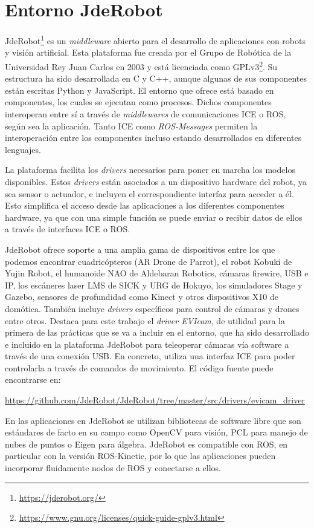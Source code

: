 \section{Entorno JdeRobot}
JdeRobot\footnote{\url{https://jderobot.org/}} es un \textit{middleware} abierto para el desarrollo de aplicaciones con robots y visión artificial. Esta plataforma fue creada por el Grupo de Robótica de la Universidad Rey Juan Carlos en 2003 y está licenciada como GPLv3\footnote{\url{https://www.gnu.org/licenses/quick-guide-gplv3.html}}.
Su estructura ha sido desarrollada en C y C++, aunque algunas de sus componentes están escritas Python y JavaScript. El entorno que ofrece está basado en componentes, los cuales se ejecutan como procesos. Dichos componentes interoperan entre sí a través de \textit{middlewares} de comunicaciones ICE o  ROS, según sea la aplicación. Tanto ICE como \textit{ROS-Messages} permiten la interoperación entre los componentes incluso estando desarrollados en diferentes lenguajes.

La plataforma facilita los \textit{drivers} necesarios para poner en marcha los modelos disponibles. Estos \textit{drivers} están asociados a un dispositivo hardware del robot, ya sea sensor o actuador, e incluyen el correspondiente interfaz para acceder a él. Esto simplifica el acceso desde las aplicaciones a los diferentes componentes hardware, ya que con una simple función se puede enviar o recibir datos de ellos a través de interfaces ICE o ROS.

JdeRobot ofrece soporte a una amplia gama de dispositivos entre los que podemos encontrar cuadricópteros (AR Drone de Parrot), el robot Kobuki de Yujin Robot, el humanoide NAO de Aldebaran Robotics, cámaras firewire, USB e IP, los escáneres laser LMS de SICK y URG de Hokuyo, los simuladores Stage y Gazebo, sensores de profundidad como Kinect y otros dispositivos X10 de domótica. También incluye \textit{drivers} específicos para control de cámaras y drones entre otros. Destaca para este trabajo el \textit{driver EVIcam}, de utilidad para la primera de las prácticas que se va a incluir en el entorno, que ha sido desarrollado e incluido en la plataforma JdeRobot para teleoperar cámaras vía software a través de una conexión USB. En concreto, utiliza una interfaz ICE para poder controlarla a través de comandos de movimiento. 
El código fuente puede encontrarse en: 

\url{https://github.com/JdeRobot/JdeRobot/tree/master/src/drivers/evicam_driver}

En las aplicaciones en JdeRobot se utilizan bibliotecas de software libre que son estándares de facto en su campo como OpenCV para visión, PCL para manejo de nubes de puntos o Eigen para álgebra. JdeRobot es compatible con ROS, en particular con la versión ROS-Kinetic, por lo que las aplicaciones pueden incorporar fluidamente nodos de ROS y conectarse a ellos.

